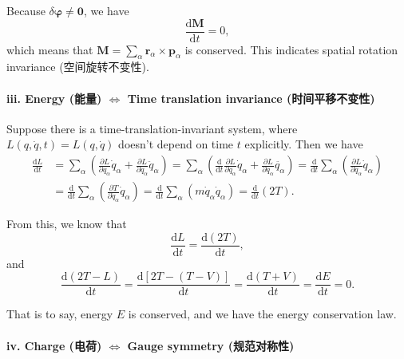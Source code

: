 Because \(\delta \boldsymbol{\varphi} \neq \boldsymbol{0}\), we have
\[\frac{\mathrm{d} \boldsymbol{M}}{\mathrm{d}t} = 0,\] which means that
\(\displaystyle \boldsymbol{M} = \sum_{\alpha} \boldsymbol{r}_\alpha \times \boldsymbol{p}_\alpha\)
is conserved. This indicates spatial rotation invariance
(空间旋转不变性).

\paragraph{iii. Energy (能量) \(\Leftrightarrow\) Time
translation invariance
(时间平移不变性)}\label{energy-ux80fdux91cf-leftrightarrow-time-translation-invariance-ux65f6ux95f4ux5e73ux79fbux4e0dux53d8ux6027}

Suppose there is a time-translation-invariant system, where
\(L(q, \dot{q}, t) = L(q, \dot{q})\) doesn't depend on time \(t\)
explicitly. Then we have \begin{align*}
    \frac{\mathrm{d} L}{\mathrm{d}t} & = \sum_{\alpha} \left( \frac{\partial L}{\partial q_\alpha} \dot{q}_\alpha + \frac{\partial L}{\partial \dot q_\alpha} \ddot{q}_\alpha \right)  = \sum_{\alpha} \left( \frac{\mathrm{d}}{\mathrm{d}t} \frac{\partial L}{\partial \dot q_\alpha} \dot{q}_\alpha + \frac{\partial L}{\partial \dot q_\alpha} \ddot{q_\alpha} \right) = \frac{\mathrm{d}}{\mathrm{d}t} \sum_{\alpha} \left( \frac{\partial L}{\partial \dot q_\alpha} \dot{q}_\alpha \right) \\
    & = \frac{\mathrm{d}}{\mathrm{d}t} \sum_{\alpha} \left( \frac{\partial T}{\partial \dot q_\alpha} \dot{q}_\alpha \right) = \frac{\mathrm{d}}{\mathrm{d}t} \sum_{\alpha} \left( m \dot{q}_\alpha \dot{q}_\alpha \right) = \frac{\mathrm{d}}{\mathrm{d}t} (2T).
\end{align*}

From this, we know that
\[\frac{\mathrm{d} L}{\mathrm{d}t} = \frac{\mathrm{d} (2T)}{\mathrm{d}t},\]
and
\[\frac{\mathrm{d} (2T - L)}{\mathrm{d}t} = \frac{\mathrm{d} [2T - (T - V)]}{\mathrm{d}t} = \frac{\mathrm{d} (T + V)}{\mathrm{d}t} = \frac{\mathrm{d} E}{\mathrm{d}t} = 0.\]

That is to say, energy \(E\) is conserved, and we have the energy
conservation law.

\paragraph{iv. Charge (电荷) \(\Leftrightarrow\) Gauge
symmetry
(规范对称性)}\label{charge-ux7535ux8377-leftrightarrow-gauge-symmetry-ux89c4ux8303ux5bf9ux79f0ux6027}

